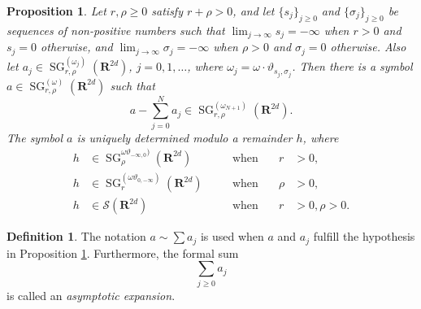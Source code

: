 \documentclass[12pt,a4paper,reqno]{amsart}
\numberwithin{equation}{section}
\numberwithin{thm}{section}
\newtheorem{prop}[thm]{Proposition}
\theoremstyle{definition}
\newtheorem{defn}[thm]{Definition}
\theoremstyle{remark}
\begin{document}
\par

\begin{prop}\label{propasymp}
Let $r,\rho \ge 0$ satisfy $r+\rho >0$, and let
$\{ s_j \} _{j\ge 0}$ and $\{ \sigma _j \} _{j\ge 0}$ be sequences of
non-positive numbers
such that $\lim _{j\to \infty} s_j =-\infty$ when $r>0$ and $s_j=0$ otherwise,
and $\lim _{j\to \infty} \sigma _j =-\infty$ when $\rho >0$ and $\sigma _j=0$
otherwise. Also let $a_j\in{\operatorname{SG}} ^{(\omega_j)}_{r,\rho}({\mathbf R^{{2d}}})$, $j=0,1,\dots$,
where $\omega_j=\omega \cdot \vartheta_{s_j,\sigma_j}$. Then there is a
symbol $a\in{\operatorname{SG}}^{(\omega)}_{r,\rho}({\mathbf R^{{2d}}})$ such that
\begin{equation}
	\label{eq:sgassum}
	a-\sum_{j=0}^Na_j\in{\operatorname{SG}}^{(\omega_{N+1})}_{r,\rho}({\mathbf R^{{2d}}}).
\end{equation}
The symbol $a$ is uniquely determined modulo a remainder $h$, where
\begin{equation}
	\label{eq:gensgasexp}
	\begin{alignedat}{3}
		h &\in {\operatorname{SG}} ^{\omega \vartheta _{-\infty ,0})}_{\rho}({\mathbf R^{{2d}}}) & \quad
		&\text{when}& \quad r&>0,
		\\[1ex]
		h &\in {\operatorname{SG}}^{(\omega \vartheta _{0,-\infty} )}_{r}({\mathbf R^{{2d}}}) & \quad
		&\text{when} & \quad \rho &> 0,
		\\[1ex]  
		h &\in \mathscr S({\mathbf R^{{2d}}}) & \quad &\text{when} &\quad r &> 0,
		\rho >0.
	\end{alignedat}
\end{equation}
\end{prop}

\par

\begin{defn}\label{def:gensgasexp}
The notation $a\sim \sum a_j$ is used when $a$ and $a_j$
fulfill the hypothesis in Proposition \ref{propasymp}. Furthermore,
the formal sum
$$
\sum_{j\ge0}a_j
$$
is called an \emph{asymptotic expansion}.
\end{defn}

\par
\end{document}
